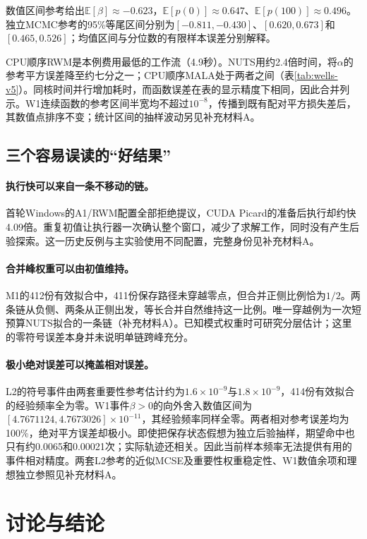\documentclass[UTF8,fontset=fandol,zihao=-4]{ctexart}
\newcommand{\E}{\mathbb{E}}
\begin{document}
数值区间参考给出$\E[\beta]\approx-0.623$，$\E[p(0)]\approx0.647$、$\E[p(100)]\approx0.496$。独立MCMC参考的95\%等尾区间分别为$[-0.811,-0.430]$、$[0.620,0.673]$和$[0.465,0.526]$；均值区间与分位数的有限样本误差分别解释。

CPU顺序RWM是本例费用最低的工作流（4.9秒）。NUTS用约2.4倍时间，将$\alpha$的参考平方误差降至约七分之一；CPU顺序MALA处于两者之间（表\ref{tab:wells-v5}）。同核时间并行增加耗时，而函数误差在表的显示精度下相同，因此合并列示。W1连续函数的参考区间半宽均不超过$10^{-8}$，传播到既有配对平方损失差后，其数值点排序不变；统计区间的抽样波动另见补充材料A。


\subsection{三个容易误读的“好结果”}
\paragraph{执行快可以来自一条不移动的链。}
首轮Windows的A1/RWM配置全部拒绝提议，CUDA Picard的准备后执行却约快4.09倍。重复初值让执行器一次确认整个窗口，减少了求解工作，同时没有产生后验探索。这一历史反例与主实验使用不同配置，完整身份见补充材料A。

\paragraph{合并峰权重可以由初值维持。}
M1的412份有效拟合中，411份保存路径未穿越零点，但合并正侧比例恰为$1/2$。两条链从负侧、两条从正侧出发，等长合并自然维持这一比例。唯一穿越例为一次短预算NUTS拟合的一条链（补充材料A）。已知模式权重时可研究分层估计；这里的零符号误差本身并未说明单链跨峰充分。

\paragraph{极小绝对误差可以掩盖相对误差。}
L2的符号事件由两套重要性参考估计约为$1.6\times10^{-9}$与$1.8\times10^{-9}$，414份有效拟合的经验频率全为零。W1事件$\beta>0$的向外舍入数值区间为$[4.7671124,4.7673026]\times10^{-11}$，其经验频率同样全零。两者相对参考误差均为100\%，绝对平方误差却极小。即使把保存状态假想为独立后验抽样，期望命中也只有约0.0065和0.00021次；实际轨迹还相关。因此当前样本频率无法提供有用的事件相对精度。两套L2参考的近似MCSE及重要性权重稳定性、W1数值余项和理想独立参照见补充材料A。

\section{讨论与结论}
\end{document}
